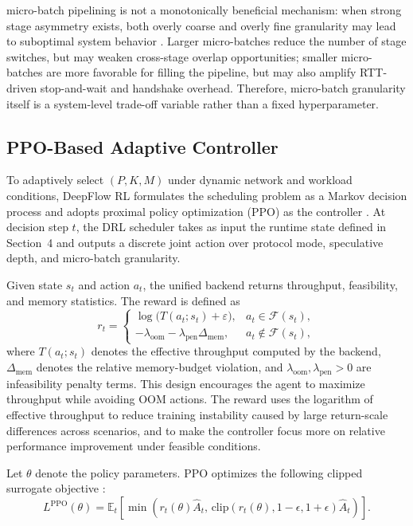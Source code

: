 \documentclass[a4paper,fleqn]{cas-dc}
\begin{document}
micro-batch pipelining is not a monotonically beneficial mechanism: when strong stage asymmetry exists, both overly coarse and overly fine granularity may lead to suboptimal system behavior \cite{zhong2024distserve,hu2025bestserve}. Larger micro-batches reduce the number of stage switches, but may weaken cross-stage overlap opportunities; smaller micro-batches are more favorable for filling the pipeline, but may also amplify RTT-driven stop-and-wait and handshake overhead. Therefore, micro-batch granularity itself is a system-level trade-off variable rather than a fixed hyperparameter.

\subsection{PPO-Based Adaptive Controller}

To adaptively select $(P,K,M)$ under dynamic network and workload conditions, DeepFlow RL formulates the scheduling problem as a Markov decision process and adopts proximal policy optimization (PPO) as the controller \cite{schulman2017ppo}. At decision step $t$, the DRL scheduler takes as input the runtime state defined in Section~4 and outputs a discrete joint action over protocol mode, speculative depth, and micro-batch granularity. 

Given state $s_t$ and action $a_t$, the unified backend returns throughput, feasibility, and memory statistics. The reward is defined as
\begin{equation}
r_t=
\begin{cases}
\log\!\big(T(a_t;s_t)+\varepsilon\big), & a_t \in \mathcal{F}(s_t),\\
-\lambda_{\text{oom}}-\lambda_{\text{pen}}\Delta_{\text{mem}}, & a_t \notin \mathcal{F}(s_t),
\end{cases}
\end{equation}
where $T(a_t;s_t)$ denotes the effective throughput computed by the backend, $\Delta_{\text{mem}}$ denotes the relative memory-budget violation, and $\lambda_{\text{oom}},\lambda_{\text{pen}}>0$ are infeasibility penalty terms. This design encourages the agent to maximize throughput while avoiding OOM actions. The reward uses the logarithm of effective throughput to reduce training instability caused by large return-scale differences across scenarios, and to make the controller focus more on relative performance improvement under feasible conditions.

Let $\theta$ denote the policy parameters. PPO optimizes the following clipped surrogate objective \cite{schulman2017ppo}:
\begin{equation}
L^{\mathrm{PPO}}(\theta)=
\mathbb{E}_t\left[
\min\left(
r_t(\theta)\hat{A}_t,\,
\mathrm{clip}(r_t(\theta),1-\epsilon,1+\epsilon)\hat{A}_t
\right)
\right].
\end{equation}
\end{document}
